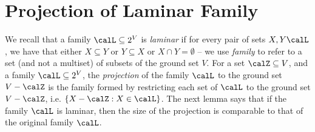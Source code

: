 \documentclass{article}
\newcommand{\shubhang}[1]{{\color{blue}[{\tiny Shubhang: \bf #1}]\marginpar{\color{blue}*}}}
\newcommand{\knote}[1]{{\color{red}[{\tiny Karthik: \bf #1}]\marginpar{\color{red}*}}}
\newcommand{\kristof}[1]{{\color{purple}[{\tiny Kristof: \bf #1}]\marginpar{\color{red}*}}}
\begin{document}
\section{Projection of Laminar Family}\label{appendix:sec:uncrossing-properties:projection-of-laminar-families}
We recall that 
a family $\calL \subseteq 2^V$ is \emph{laminar} if for every pair of sets $X, Y\calL$, we have that either $X\subseteq Y$ or $Y\subseteq X$ or $X\cap Y=\emptyset$  --  we use \emph{family} to refer to a set (and not a multiset) of subsets of the ground set $V$. 
For a set $\calZ\subseteq V$, and a family $\calL \subseteq 2^V$,
the \emph{projection} of the family $\calL$ to the ground set $V - \calZ$ is the family formed by restricting each set of $\calL$ to the ground set $V - \calZ$, i.e. $\{X - \calZ : X \in \calL\}$.
The next lemma says that if the family $\calL$ is laminar, then the size of the projection %
is comparable to that of the original family $\calL$.
\end{document}
